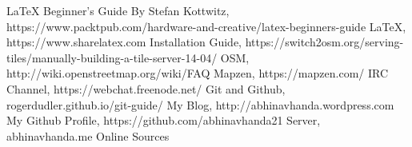 
\begin{thebibliography}{9}
\bibitem{} \LaTeX{} Beginner's Guide By Stefan Kottwitz, https://www.packtpub.com/hardware-and-creative/latex-beginners-guide 
\bibitem{} \LaTeX{}, https://www.sharelatex.com
\bibitem{} Installation Guide, https://switch2osm.org/serving-tiles/manually-building-a-tile-server-14-04/
\bibitem{} OSM, http://wiki.openstreetmap.org/wiki/FAQ
\bibitem{} Mapzen, https://mapzen.com/
\bibitem{} IRC Channel, https://webchat.freenode.net/
\bibitem{} Git and Github, rogerdudler.github.io/git-guide/
\bibitem{} My Blog, http://abhinavhanda.wordpress.com
\bibitem{} My Github Profile, https://github.com/abhinavhanda21
\bibitem{} Server, abhinavhanda.me
\bibitem{} Online Sources
\end{thebibliography}


